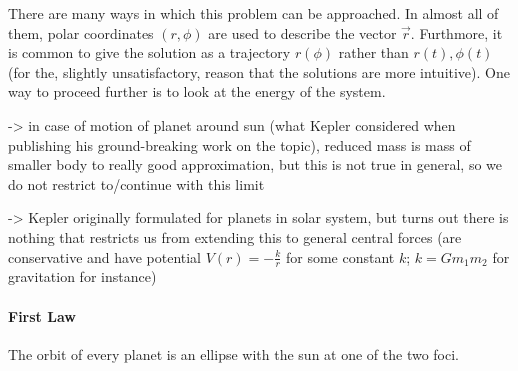 \documentclass[../class_mech_main.tex]{subfiles}
\begin{document}
There are many ways in which this problem can be approached. In almost all of them, polar coordinates $(r, \phi)$ are used to describe the vector $\vec{r}$. Furthmore, it is common to give the solution as a trajectory $r(\phi)$ rather than $r(t), \phi(t)$ (for the, slightly unsatisfactory, reason that the solutions are more intuitive). One way to proceed further is to look at the energy of the system.





-> in case of motion of planet around sun (what Kepler considered when publishing his ground-breaking work on the topic), reduced mass is mass of smaller body to really good approximation, but this is not true in general, so we do not restrict to/continue with this limit%



-> Kepler originally formulated for planets in solar system, but turns out there is nothing that restricts us from extending this to general central forces (are conservative and have potential $V(r) = - \frac{k}{r}$ for some constant $k$; $k = G m_1 m_2$ for gravitation for instance)







			\paragraph{First Law}

\begin{center}
	The orbit of every planet is an ellipse with the sun at one of the two foci.
\end{center}

\end{document}
